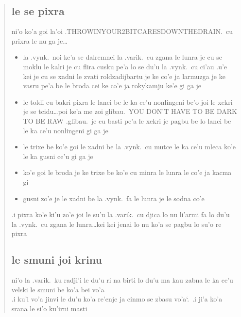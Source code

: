 \documentclass{report}
\newcommand\sds{\spacefactor\sfcode`.\ \space}
\begin{document}
\begin{quote}
	\subsection{le se pixra}
	ni'o ko'a goi la'oi .THROWINYOUR2BITCARESDOWNTHEDRAIN.\ cu prixra le nu ga je\ldots
	\begin{itemize}
		\item la .vynk.\ noi ke'a se dalremnei la .varik.\ cu zgana le lunra je cu se moklu le kalri je cu flira cusku pe'a lo se du'u la .vynk.\ cu ci'au .u'e kei je cu se xadni le zvati roldzadijbartu je ke co'e ja larmuzga je ke vasru pe'a be le broda cei ke co'e ja rokykamju ke'e gi ga je
		\item le toldi cu bakri pixra le lanci be le ka ce'u nonlingeni be'o joi le xekri je se tcidu\ldots poi ke'a me zoi glibau.\ YOU DON'T HAVE TO BE DARK TO BE RAW .glibau.\ je cu basti pe'a le xekri je pagbu be lo lanci be le ka ce'u nonlingeni gi ga je
		\item le trixe be ko'e goi le xadni be la .vynk.\ cu mutce le ka ce'u mleca ko'e le ka gusni ce'u gi ga je
		\item  ko'e goi le broda je ke trixe be ko'e cu minra le lunra le co'e ja kacma gi
		\item  gusni zo'e je le xadni be la .vynk.\ fa le lunra je le sodna co'e
	\end{itemize}

	.i pixra ko'e ki'u zo'e joi le su'u la .varik.\ cu djica lo nu li'armi fa lo du'u la .vynk.\ cu zgana le lunra\ldots kei kei jenai lo nu ko'a se pagbu lo su'o re pixra

	\subsection{le smuni joi krinu}
	ni'o la .varik.\ ku radji'i le du'u ri na birti lo du'u ma kau zabna le ka ce'u velski le smuni be ko'a bei vo'a\\
	.i ku'i vo'a jinvi le du'u ko'a re'enje ja cinmo se zbasu vo'a\sds  .i ji'a ko'a srana le si'o ku'irni masti


\end{quote}
\end{document}
